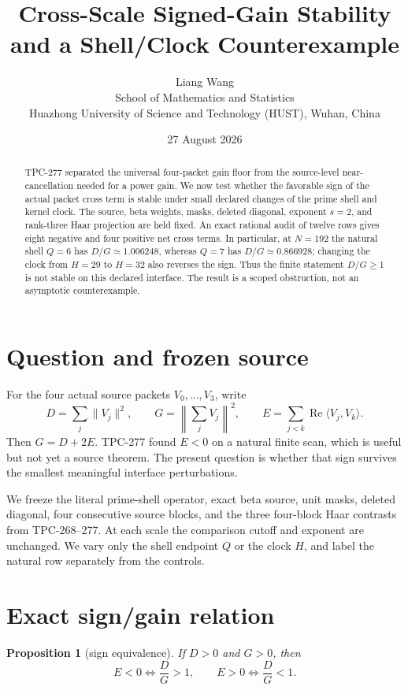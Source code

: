 \documentclass[11pt]{article}
\title{Cross-Scale Signed-Gain Stability and a Shell/Clock Counterexample}
\author{Liang Wang\\
School of Mathematics and Statistics\\
Huazhong University of Science and Technology (HUST), Wuhan, China}
\date{27 August 2026}
\newtheorem{proposition}[theorem]{Proposition}
\begin{document}
\maketitle

\begin{abstract}
TPC-277 separated the universal four-packet gain floor from the source-level
near-cancellation needed for a power gain.  We now test whether the favorable
sign of the actual packet cross term is stable under small declared changes
of the prime shell and kernel clock.  The source, beta weights, masks,
deleted diagonal, exponent $s=2$, and rank-three Haar projection are held
fixed.  An exact rational audit of twelve rows gives eight negative and four
positive net cross terms.  In particular, at $N=192$ the natural shell
$Q=6$ has $D/G\simeq1.006248$, whereas $Q=7$ has $D/G\simeq0.866928$;
changing the clock from $H=29$ to $H=32$ also reverses the sign.  Thus the
finite statement $D/G\geq1$ is not stable on this declared interface.  The
result is a scoped obstruction, not an asymptotic counterexample.
\end{abstract}

\section{Question and frozen source}

For the four actual source packets $V_0,\ldots,V_3$, write
\[
 D=\sum_j\|V_j\|^2,\qquad G=\left\|\sum_jV_j\right\|^2,
 \qquad E=\sum_{j<k}\operatorname{Re}\langle V_j,V_k\rangle.
\]
Then $G=D+2E$.  TPC-277 found $E<0$ on a natural finite scan, which is
useful but not yet a source theorem.  The present question is whether that
sign survives the smallest meaningful interface perturbations.

We freeze the literal prime-shell operator, exact beta source, unit masks,
deleted diagonal, four consecutive source blocks, and the three four-block
Haar contrasts from TPC-268--277.  At each scale the comparison cutoff and
exponent are unchanged.  We vary only the shell endpoint $Q$ or the clock
$H$, and label the natural row separately from the controls.

\section{Exact sign/gain relation}

\begin{proposition}[sign equivalence]
If $D>0$ and $G>0$, then
\[
 E<0\Longleftrightarrow \frac DG>1,
 \qquad E>0\Longleftrightarrow \frac DG<1.
\]
\end{proposition}
\end{document}
